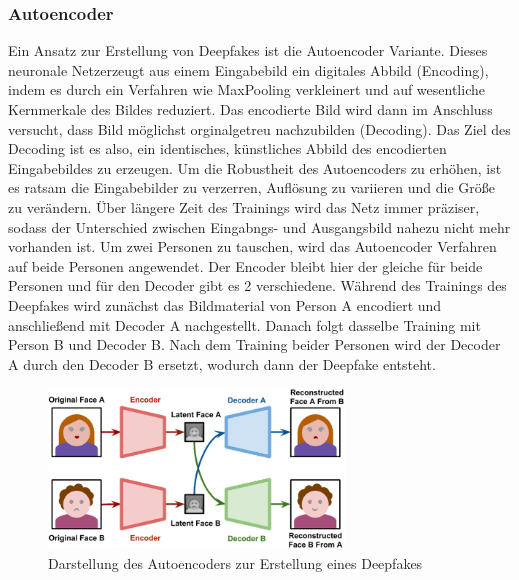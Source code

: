 \subsubsection{Autoencoder}
Ein Ansatz zur Erstellung von Deepfakes ist die Autoencoder Variante. Dieses neuronale Netzerzeugt aus einem Eingabebild ein digitales Abbild (Encoding), indem es durch ein Verfahren wie \gls{MaxPooling} verkleinert und auf wesentliche Kernmerkale des Bildes reduziert. Das encodierte Bild wird dann im Anschluss versucht, dass Bild möglichst orginalgetreu nachzubilden (Decoding). Das Ziel des Decoding ist es also, ein identisches, künstliches Abbild des encodierten Eingabebildes zu erzeugen. Um die Robustheit des Autoencoders zu erhöhen, ist es ratsam die Eingabebilder zu verzerren, Auflösung zu variieren und die Größe zu verändern.  Über längere Zeit des Trainings wird das Netz immer präziser, sodass der Unterschied zwischen Eingabngs- und Ausgangsbild nahezu nicht mehr vorhanden ist.\newline
Um zwei Personen zu tauschen, wird das Autoencoder Verfahren auf beide Personen angewendet. Der Encoder bleibt hier der gleiche für beide Personen und für den Decoder gibt es 2 verschiedene. Während des Trainings des Deepfakes wird zunächst das Bildmaterial von Person A encodiert und anschließend mit Decoder A nachgestellt. Danach folgt dasselbe Training mit Person B und Decoder B. Nach dem Training beider Personen wird der Decoder A durch den Decoder B ersetzt, wodurch dann der Deepfake entsteht.\cite{HochschuleDerMedien}
\begin{figure}[H]
    \includegraphics[width=0.7\textwidth]{Bilder/Autoencoder}
    \centering
    \caption{Darstellung des Autoencoders zur Erstellung eines Deepfakes\cite{HochschuleDerMedien}}
    \label{fig:Autoencoder}
\end{figure}

